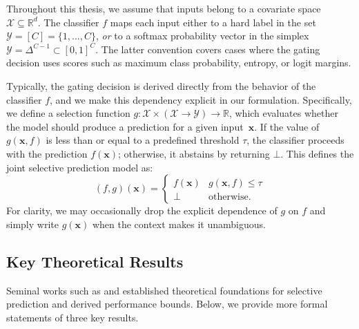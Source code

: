 Throughout this thesis, we assume that inputs belong to a covariate space~$\mathcal{X} \subseteq \mathbb{R}^d$. The classifier $f$ maps each input either to a hard label in the set $\mathcal{Y} = [C] = \{1,\dots,C\}$, \emph{or} to a softmax probability vector in the simplex $\mathcal{Y} = \Delta^{C-1} \subset [0,1]^C$. The latter convention covers cases where the gating decision uses scores such as maximum class probability, entropy, or logit margins.

Typically, the gating decision is derived directly from the behavior of the classifier $f$, and we make this dependency explicit in our formulation. Specifically, we define a selection function $g: \mathcal{X} \times (\mathcal{X} \rightarrow \mathcal{Y}) \rightarrow \mathbb{R}$, which evaluates whether the model should produce a prediction for a given input~$\bm{x}$. If the value of $g(\bm{x}, f)$ is less than or equal to a predefined threshold $\tau$, the classifier proceeds with the prediction $f(\bm{x})$; otherwise, it abstains by returning $\bot$. This defines the joint selective prediction model as:
\begin{equation}
    (f,g)(\bm{x}) = \begin{cases}
      f(\bm{x}) & g(\bm{x}, f) \leq \tau \\
      \bot & \text{otherwise.}
    \end{cases}
\end{equation}
For clarity, we may occasionally drop the explicit dependence of $g$ on $f$ and simply write $g(\bm{x})$ when the context makes it unambiguous.

\subsection{Key Theoretical Results}
Seminal works such as \citet{chow1957optimum} and \citet{el2010foundations} established theoretical foundations for selective prediction and derived performance bounds. Below, we provide more formal statements of three key results.

